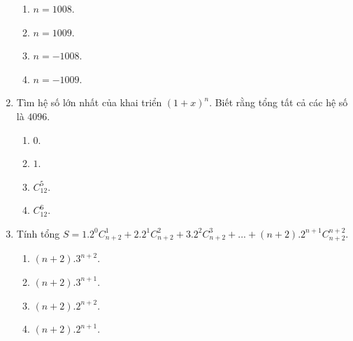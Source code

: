 \begin{enumerate}[label=\textbf{Câu \arabic*.},align=left,left=0cm..0cm,itemindent=*]
	\begin{enumerate}[label=\textbf{\Alph*.},align=left,left=1cm..0cm,itemindent=*]
		\item $n=1008$. \item $n=1009$. \item $n=-1008$. \item $n=-1009$.
	\end{enumerate}
	\item Tìm hệ số lớn nhất của khai triển $(1+x)^n$. Biết rằng tổng tất cả các hệ số là $4096$.
	\begin{multicols}{4}\begin{enumerate}[label=\textbf{\Alph*.},align=left,left=1cm..0cm,itemindent=*]
		\item $0$. \item $1$. \item $C_{12}^5$. \item $C_{12}^6$.
	\end{enumerate}\end{multicols}
	\item Tính tổng $S=1.2^0C_{n+2}^1+2.2^1C_{n+2}^2+3.2^2C_{n+2}^3+...+(n+2).2^{n+1}C_{n+2}^{n+2}$.
	\begin{enumerate}[label=\textbf{\Alph*.},align=left,left=1cm..0cm,itemindent=*]
		\item $(n+2).3^{n+2}$. \item $(n+2).3^{n+1}$. \item $(n+2).2^{n+2}$. \item $(n+2).2^{n+1}$.
	\end{enumerate}
\end{enumerate}\par

